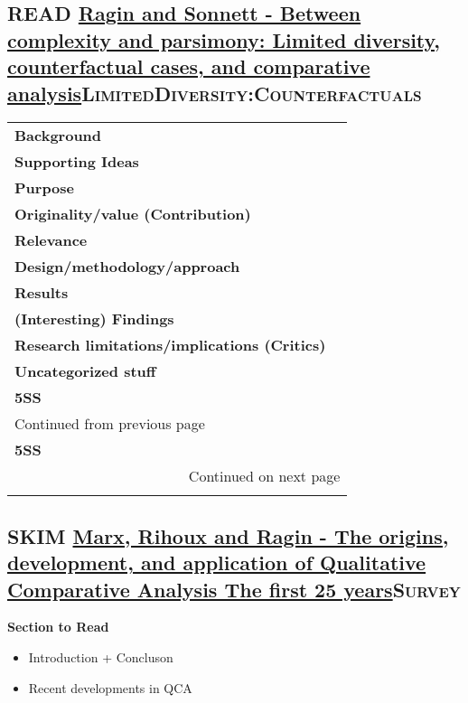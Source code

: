 \documentclass[11pt]{article}
\begin{document}
\subsection*{{\bfseries\sffamily READ} \href{http://www.u.arizona.edu/\~cragin/fsQCA//download/Counterfactuals.pdf}{Ragin and Sonnett - Between complexity and parsimony: Limited diversity, counterfactual cases, and comparative analysis}\hfill{}\textsc{LimitedDiversity:Counterfactuals}}
\label{sec:org742ba86}
\begin{longtable}{l|p{}}
\hline
\hline
\textbf{Background} & \\
\textbf{Supporting Ideas} & \\
\textbf{Purpose} & \\
\textbf{Originality/value (Contribution)} & \\
\textbf{Relevance} & \\
\textbf{Design/methodology/approach} & \\
\textbf{Results} & \\
\textbf{(Interesting) Findings} & \\
\textbf{Research limitations/implications (Critics)} & \\
\textbf{Uncategorized stuff} & \\
\textbf{5SS} & \\
\hline
\endfirsthead
\multicolumn{2}{l}{Continued from previous page} \\

\textbf{5SS} &  \\

\hline
\endhead
\hline\multicolumn{2}{r}{Continued on next page} \\
\endfoot
\endlastfoot
\hline
\hline
\end{longtable}


\subsection*{{\bfseries\sffamily SKIM} \href{https://pdfs.semanticscholar.org/7624/660320e7a032012245a4bbd20dd3397e77bd.pdf}{Marx, Rihoux and Ragin - The origins, development, and application of Qualitative Comparative Analysis The first 25 years}\hfill{}\textsc{Survey}}
\label{sec:org5aa5820}
\textbf{Section to Read}

\begin{itemize}
\item Introduction  + Concluson
\item Recent developments in QCA
\end{itemize}
\end{document}
